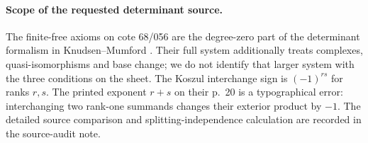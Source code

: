 \paragraph{Scope of the requested determinant source.}
The finite-free axioms on cote 68/056 are the degree-zero part of the
determinant formalism in Knudsen--Mumford
\cite[Chapter I, pp.~20--25, Definition~1 and Theorem~1]{KnudsenMumford1976C}.
Their full system additionally treats complexes, quasi-isomorphisms and
base change; we do not identify that larger system with the three
conditions on the sheet. The Koszul interchange sign is
$(-1)^{rs}$ for ranks $r,s$. The printed exponent $r+s$ on their p.~20
is a typographical error: interchanging two rank-one summands changes
their exterior product by $-1$. The detailed source comparison and
splitting-independence calculation are recorded in the source-audit note.
